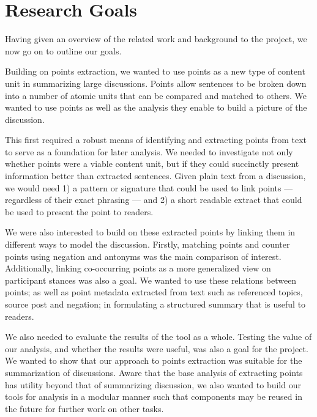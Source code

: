 \chapter{Research Goals\label{chap:res-goals}}
  Having given an overview of the related work and background to the project, we now go on to outline our goals.

  Building on points extraction, we wanted to use points as a new type of content unit in summarizing large discussions. Points allow sentences to be broken down into a number of atomic units that can be compared and matched to others. We wanted to use points as well as the analysis they enable to build a picture of the discussion.

  This first required a robust means of identifying and extracting points from text to serve as a foundation for later analysis. We needed to investigate not only whether points were a viable content unit, but if they could succinctly present information better than extracted sentences. Given plain text from a discussion, we would need 1) a pattern or signature that could be used to link points --- regardless of their exact phrasing --- and 2) a short readable extract that could be used to present the point to readers.

  We were also interested to build on these extracted points by linking them in different ways to model the discussion. Firstly, matching points and counter points using negation and antonyms was the main comparison of interest. Additionally, linking co-occurring points as a more generalized view on participant stances was also a goal. We wanted to use these relations between points; as well as point metadata extracted from text such as referenced topics, source post and negation; in formulating a structured summary that is useful to readers.

  We also needed to evaluate the results of the tool as a whole. Testing the value of our analysis, and whether the results were useful, was also a goal for the project. We wanted to show that our approach to points extraction was suitable for the summarization of discussions. Aware that the base analysis of extracting points has utility beyond that of summarizing discussion, we also wanted to build our tools for analysis in a modular manner such that components may be reused in the future for further work on other tasks.
